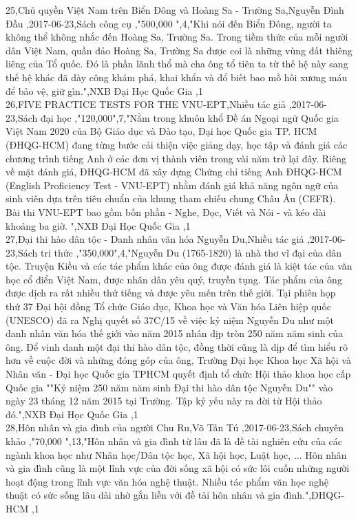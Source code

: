 \documentclass[a4paper]{article}
\begin{document}
25,Chủ quyền Việt Nam trên Biển Đông và Hoàng Sa - Trường Sa,Nguyễn Đình Đầu ,2017-06-23,Sách công cụ ,"500,000 ",4,"Khi nói đến Biển Đông, người ta không thể không nhắc đến Hoàng Sa, Trường Sa. Trong tiềm thức của mỗi người dân Việt Nam, quần đảo Hoàng Sa, Trường Sa được coi là những vùng đất thiêng liêng của Tổ quốc. Đó là phần lãnh thổ mà cha ông tổ tiên ta từ thế hệ này sang thế hệ khác đã dày công khám phá, khai khẩn và đổ biết bao mồ hôi xương máu để bảo vệ, giữ gìn.",NXB Đại Học Quốc Gia ,1\\
26,FIVE PRACTICE TESTS FOR THE VNU-EPT,Nhiều tác giả ,2017-06-23,Sách đại học ,"120,000",7,"Nằm trong khuôn khổ Đề án Ngoại ngữ Quốc gia Việt Nam 2020 của Bộ Giáo dục và Đào tạo, Đại học Quốc gia TP. HCM (ĐHQG-HCM) đang từng bước cải thiện việc giảng dạy, học tập và đánh giá các chương trình tiếng Anh ở các đơn vị thành viên trong vài năm trở lại đây. Riêng về mặt đánh giá, ĐHQG-HCM đã xây dựng Chứng chỉ tiếng Anh ĐHQG-HCM (English Proficiency Test - VNU-EPT) nhằm đánh giá khả năng ngôn ngữ của sinh viên dựa trên tiêu chuẩn của khung tham chiếu chung Châu Âu (CEFR). Bài thi VNU-EPT bao gồm bốn phần - Nghe, Đọc, Viết và Nói - và kéo dài khoảng ba giờ. ",NXB Đại Học Quốc Gia ,1\\
27,Đại thi hào dân tộc - Danh nhân văn hóa Nguyễn Du,Nhiều tác giả ,2017-06-23,Sách tri thức ,"350,000",4,"Nguyễn Du (1765-1820) là nhà thơ vĩ đại của dân tộc. Truyện Kiều và các tác phẩm khác của ông được đánh giá là kiệt tác của văn học cổ điển Việt Nam, được nhân dân yêu quý, truyền tụng. Tác phẩm của ông được dịch ra rất nhiều thứ tiếng và được yêu mến trên thế giới. Tại phiên họp thứ 37 Đại hội đồng Tổ chức Giáo dục, Khoa học và Văn hóa Liên hiệp quốc (UNESCO) đã ra Nghị quyết số 37C/15 về việc kỷ niệm Nguyễn Du như một danh nhân văn hóa thế giới vào năm 2015 nhân dịp tròn 250 năm năm sinh của ông. Để vinh danh một đại thi hào dân tộc, đồng thời cũng là dịp để tìm hiểu rõ hơn về cuộc đời và những đóng góp của ông, Trường Đại học Khoa học Xã hội và Nhân văn - Đại học Quốc gia TPHCM quyết định tổ chức Hội thảo khoa học cấp Quốc gia ""Kỷ niệm 250 năm năm sinh Đại thi hào dân tộc Nguyễn Du"" vào ngày 23 tháng 12 năm 2015 tại Trường. Tập kỷ yếu này ra đời từ Hội thảo đó.",NXB Đại Học Quốc Gia ,1\\
28,Hôn nhân và gia đình của người Chu Ru,Võ Tấn Tú ,2017-06-23,Sách chuyên khảo ,"70,000 ",13,"Hôn nhân và gia đình từ lâu đã là đề tài nghiên cứu của các ngành khoa học như Nhân học/Dân tộc học, Xã hội học, Luật học, ... Hôn nhân và gia đình cũng là một lĩnh vực của đời sống xã hội có sức lôi cuốn những người hoạt động trong lĩnh vực văn hóa nghệ thuật. Nhiều tác phẩm văn học nghệ thuật có sức sống lâu dài nhờ gắn liền với đề tài hôn nhân và gia đình.",ĐHQG-HCM ,1\\
\end{document}
